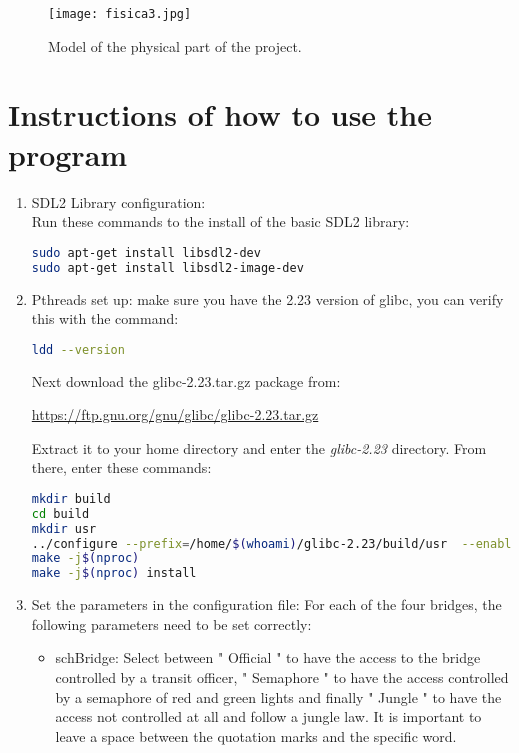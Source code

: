 \documentclass[a4paper,9pt]{article}
\begin{document}
  \begin{figure}[H]
\centering
\texttt{[image: fisica3.jpg]}
\caption{Model of the physical part of the project. }
\label{figfisica3}
 \end{figure} \bigskip

\section{Instructions of how to use the program}

\begin{enumerate}
\item SDL2 Library configuration:\\

Run these commands to the install of the basic SDL2 library:
\begin{lstlisting}[language=Bash]
sudo apt-get install libsdl2-dev
sudo apt-get install libsdl2-image-dev 
\end{lstlisting}

\item Pthreads set up: make sure you have the 2.23 version of glibc, you can verify this with the command:
\begin{lstlisting}[language=Bash]
ldd --version
\end{lstlisting}
Next download the glibc-2.23.tar.gz package from:

\url{https://ftp.gnu.org/gnu/glibc/glibc-2.23.tar.gz} 

Extract it to your home directory and enter the \emph{glibc-2.23} directory. From there, enter these commands:
\begin{lstlisting}[language=Bash]
mkdir build
cd build
mkdir usr
../configure --prefix=/home/$(whoami)/glibc-2.23/build/usr  --enable-addons
make -j$(nproc)
make -j$(nproc) install
\end{lstlisting}


\item Set the parameters in the configuration file: For each of the four bridges, the following parameters need to be set correctly:
\begin{itemize}
\item schBridge: Select between " Official " to have the access to the bridge controlled by a transit officer, " Semaphore " to have the access controlled by a semaphore of red and green lights and finally " Jungle " to have the access not controlled at all and follow a jungle law. It is important to leave a space between the quotation marks and the specific word.


\end{itemize}
\end{enumerate}
\end{document}
